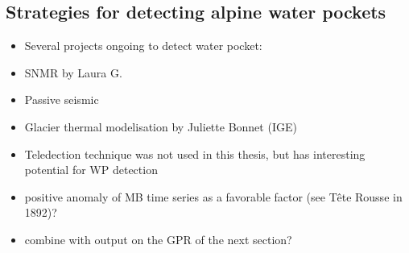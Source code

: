 \subsection{ Strategies for detecting alpine water pockets}

\begin{itemize}
    \item Several projects ongoing to detect water pocket:
    \item SNMR by Laura G.
    \item Passive seismic
    \item Glacier thermal modelisation by Juliette Bonnet (IGE)
    \item Teledection technique was not used in this thesis, but has interesting potential for WP detection
    \item positive anomaly of MB time series as a favorable factor (see Tête Rousse in 1892)?
    \item combine with output on the GPR of the next section?
\end{itemize}



